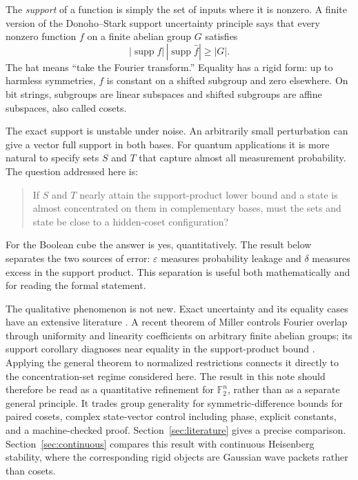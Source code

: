 \documentclass[11pt]{article}
\theoremstyle{remark}
\newcommand{\F}{\mathbb F}
\newcommand{\1}{\mathbf 1}
\newcommand{\supp}{\operatorname{supp}}
\begin{document}
The \emph{support} of a function is simply the set of inputs where it is
nonzero. A finite version of the Donoho--Stark support uncertainty principle
says that every nonzero function $f$ on a finite abelian group $G$ satisfies
\[
  |\supp f|\,|\supp\widehat f|\geq |G|.
\]
The hat means ``take the Fourier transform.'' Equality has a rigid form:
up to harmless symmetries, $f$ is constant on a shifted subgroup and zero
elsewhere. On bit strings, subgroups are linear subspaces and shifted
subgroups are affine subspaces, also called cosets.

The exact support is unstable under noise. An arbitrarily small perturbation
can give a vector full support in both bases. For quantum applications it is
more natural to specify sets $S$ and $T$ that capture almost all measurement
probability. The question addressed here is:

\begin{quote}
If $S$ and $T$ nearly attain the support-product lower bound and a state is
almost concentrated on them in complementary bases, must the sets and state
be close to a hidden-coset configuration?
\end{quote}

For the Boolean cube the answer is yes, quantitatively. The result below
separates the two sources of error: $\varepsilon$ measures probability
leakage and $\delta$ measures excess in the support product. This separation
is useful both mathematically and for reading the formal statement.

The qualitative phenomenon is not new. Exact uncertainty and its equality
cases have an extensive literature
\cite{DonohoStark1989,Meshulam2006,BonamiGhobber2013,FengHollmannXiang2019,
WigdersonWigderson2021}. A recent theorem of Miller controls Fourier overlap
through uniformity and linearity coefficients on arbitrary finite abelian
groups; its support corollary diagnoses near equality in the support-product
bound \cite{Miller2026}. Applying the general theorem to normalized
restrictions connects it directly to the concentration-set regime considered
here. The result in this note should therefore be read as a quantitative
refinement for $\F_2^n$, rather than as a separate general principle. It
trades group generality for symmetric-difference bounds for paired cosets,
complex state-vector control including phase, explicit constants, and a
machine-checked proof. Section~\ref{sec:literature} gives a precise
comparison.
Section~\ref{sec:continuous} compares this result with continuous Heisenberg
stability, where the corresponding rigid objects are Gaussian wave packets
rather than cosets.
\end{document}
